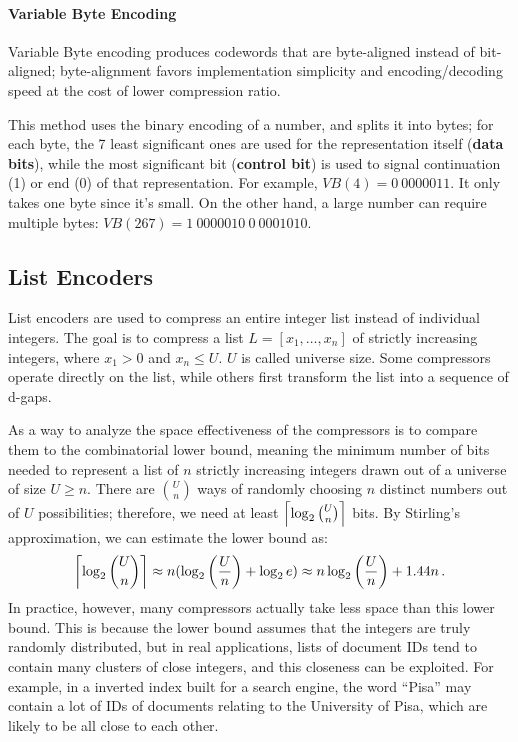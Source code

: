 \paragraph{Variable Byte Encoding}

Variable Byte encoding produces codewords that are byte-aligned instead of bit-aligned; byte-alignment favors implementation simplicity and encoding/decoding speed at the cost of lower compression ratio. 

This method uses the binary encoding of a number, and splits it into bytes; for each byte, the 7 least significant ones are used for the representation itself (\textbf{data bits}), while the most significant bit (\textbf{control bit}) is used to signal continuation (1) or end (0) of that representation. For example, $VB(4) = 0 \ 0000011$. It only takes one byte since it's small. On the other hand, a large number can require multiple bytes: $\textit{VB}(267) = 1 \ 0000010 \ 0 \ 0001010$.

\subsection{List Encoders}

List encoders are used to compress an entire integer list instead of individual integers. The goal is to compress a list $L = [x_1, \dots, x_n]$ of strictly increasing integers, where $x_1 > 0$ and $x_n \leq U$. $U$ is called universe size. Some compressors operate directly on the list, while others first transform the list into a sequence of d-gaps.

As a way to analyze the space effectiveness of the compressors is to compare them to the combinatorial lower bound, meaning the minimum number of bits needed to represent a list of $n$ strictly increasing integers drawn out of a universe of size $U \geq n$. There are $\binom{U}{n}$ ways of randomly choosing $n$ distinct numbers out of $U$ possibilities; therefore, we need at least $\left\lceil\log_2 \binom{U}{n}\right\rceil$ bits. By Stirling's approximation, we can estimate the lower bound as:
\begin{equation*}
    \left\lceil\log_2 \binom{U}{n}\right\rceil \approx n (\log_2 \left(\frac{U}{n}\right) + \log_2 e) \approx n \log_2 \left(\frac{U}{n}\right) + 1.44 n \,.
\end{equation*}
In practice, however, many compressors actually take less space than this lower bound. This is because the lower bound assumes that the integers are truly randomly distributed, but in real applications, lists of document IDs tend to contain many clusters of close integers, and this closeness can be exploited. For example, in a inverted index built for a search engine, the word ``Pisa'' may contain a lot of IDs of documents relating to the University of Pisa, which are likely to be all close to each other.

